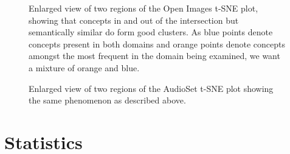 \begin{figure}[H]
    \centering
    \caption{Enlarged view of two regions of the Open Images t-SNE plot, showing that concepts in and out of the intersection but semantically similar do form good clusters. As blue points denote concepts present in both domains and orange points denote concepts amongst the most frequent in the domain being examined, we want a mixture of orange and blue. }
\end{figure}

\begin{figure}[H]
    \centering
    \caption{Enlarged view of two regions of the AudioSet t-SNE plot showing the same phenomenon as described above.}
\end{figure}


\section{Statistics}

